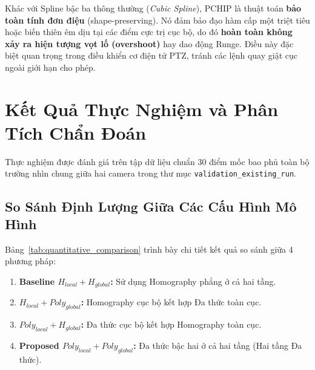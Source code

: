 \documentclass[11pt,a4paper]{article}
\begin{document}
\begin{infobox}
Khác với Spline bậc ba thông thường (\textit{Cubic Spline}), PCHIP là thuật toán \textbf{bảo toàn tính đơn điệu} (shape-preserving). Nó đảm bảo đạo hàm cấp một triệt tiêu hoặc biến thiên êm dịu tại các điểm cực trị cục bộ, do đó \textbf{hoàn toàn không xảy ra hiện tượng vọt lố (overshoot)} hay dao động Runge. Điều này đặc biệt quan trọng trong điều khiển cơ điện tử PTZ, tránh các lệnh quay giật cục ngoài giới hạn cho phép.
\end{infobox}

\section{Kết Quả Thực Nghiệm và Phân Tích Chẩn Đoán}

Thực nghiệm được đánh giá trên tập dữ liệu chuẩn 30 điểm mốc bao phủ toàn bộ trường nhìn chung giữa hai camera trong thư mục \texttt{validation\_existing\_run}.

\subsection{So Sánh Định Lượng Giữa Các Cấu Hình Mô Hình}

Bảng~\ref{tab:quantitative_comparison} trình bày chi tiết kết quả so sánh giữa 4 phương pháp:
\begin{enumerate}
    \item \textbf{Baseline $H_{local} + H_{global}$:} Sử dụng Homography phẳng ở cả hai tầng.
    \item \textbf{$H_{local} + Poly_{global}$:} Homography cục bộ kết hợp Đa thức toàn cục.
    \item \textbf{$Poly_{local} + H_{global}$:} Đa thức cục bộ kết hợp Homography toàn cục.
    \item \textbf{Proposed $Poly_{local} + Poly_{global}$:} Đa thức bậc hai ở cả hai tầng (Hai tầng Đa thức).
\end{enumerate}
\end{document}
